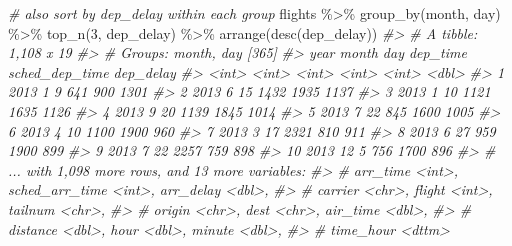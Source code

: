 \documentclass[
]{book}
\newenvironment{Shaded}{\begin{snugshade}}{\end{snugshade}}
\newcommand{\CommentTok}[1]{\textcolor[rgb]{0.56,0.35,0.01}{\textit{#1}}}
\newcommand{\DecValTok}[1]{\textcolor[rgb]{0.00,0.00,0.81}{#1}}
\newcommand{\FunctionTok}[1]{\textcolor[rgb]{0.00,0.00,0.00}{#1}}
\newcommand{\NormalTok}[1]{#1}
\newcommand{\SpecialCharTok}[1]{\textcolor[rgb]{0.00,0.00,0.00}{#1}}
\begin{document}
\begin{Shaded}
\begin{Highlighting}[]
\CommentTok{\# also sort by dep\_delay within each group}
\NormalTok{flights }\SpecialCharTok{\%\textgreater{}\%} \FunctionTok{group\_by}\NormalTok{(month, day) }\SpecialCharTok{\%\textgreater{}\%} \FunctionTok{top\_n}\NormalTok{(}\DecValTok{3}\NormalTok{, dep\_delay) }\SpecialCharTok{\%\textgreater{}\%} \FunctionTok{arrange}\NormalTok{(}\FunctionTok{desc}\NormalTok{(dep\_delay))}
\CommentTok{\#\textgreater{} \# A tibble: 1,108 x 19}
\CommentTok{\#\textgreater{} \# Groups:   month, day [365]}
\CommentTok{\#\textgreater{}     year month   day dep\_time sched\_dep\_time dep\_delay}
\CommentTok{\#\textgreater{}    \textless{}int\textgreater{} \textless{}int\textgreater{} \textless{}int\textgreater{}    \textless{}int\textgreater{}          \textless{}int\textgreater{}     \textless{}dbl\textgreater{}}
\CommentTok{\#\textgreater{}  1  2013     1     9      641            900      1301}
\CommentTok{\#\textgreater{}  2  2013     6    15     1432           1935      1137}
\CommentTok{\#\textgreater{}  3  2013     1    10     1121           1635      1126}
\CommentTok{\#\textgreater{}  4  2013     9    20     1139           1845      1014}
\CommentTok{\#\textgreater{}  5  2013     7    22      845           1600      1005}
\CommentTok{\#\textgreater{}  6  2013     4    10     1100           1900       960}
\CommentTok{\#\textgreater{}  7  2013     3    17     2321            810       911}
\CommentTok{\#\textgreater{}  8  2013     6    27      959           1900       899}
\CommentTok{\#\textgreater{}  9  2013     7    22     2257            759       898}
\CommentTok{\#\textgreater{} 10  2013    12     5      756           1700       896}
\CommentTok{\#\textgreater{} \# ... with 1,098 more rows, and 13 more variables:}
\CommentTok{\#\textgreater{} \#   arr\_time \textless{}int\textgreater{}, sched\_arr\_time \textless{}int\textgreater{}, arr\_delay \textless{}dbl\textgreater{},}
\CommentTok{\#\textgreater{} \#   carrier \textless{}chr\textgreater{}, flight \textless{}int\textgreater{}, tailnum \textless{}chr\textgreater{},}
\CommentTok{\#\textgreater{} \#   origin \textless{}chr\textgreater{}, dest \textless{}chr\textgreater{}, air\_time \textless{}dbl\textgreater{},}
\CommentTok{\#\textgreater{} \#   distance \textless{}dbl\textgreater{}, hour \textless{}dbl\textgreater{}, minute \textless{}dbl\textgreater{},}
\CommentTok{\#\textgreater{} \#   time\_hour \textless{}dttm\textgreater{}}
\end{Highlighting}
\end{Shaded}
\end{document}
